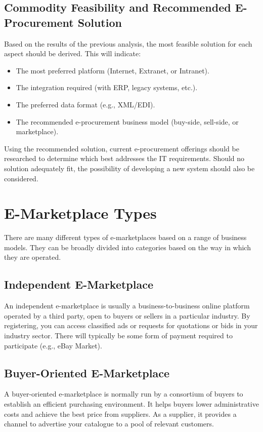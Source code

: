 \documentclass[12pt,a4paper]{article}
\begin{document}
\subsection{Commodity Feasibility and Recommended E-Procurement Solution}

Based on the results of the previous analysis, the most feasible solution for each aspect should be derived. This will indicate:
\begin{itemize}
    \item The most preferred platform (Internet, Extranet, or Intranet).
    \item The integration required (with ERP, legacy systems, etc.).
    \item The preferred data format (e.g., XML/EDI).
    \item The recommended e-procurement business model (buy-side, sell-side, or marketplace).
\end{itemize}

Using the recommended solution, current e-procurement offerings should be researched to determine which best addresses the IT requirements. Should no solution adequately fit, the possibility of developing a new system should also be considered.

\section{E-Marketplace Types}

There are many different types of e-marketplaces based on a range of business models. They can be broadly divided into categories based on the way in which they are operated.

\subsection{Independent E-Marketplace}
An independent e-marketplace is usually a business-to-business online platform operated by a third party, open to buyers or sellers in a particular industry. By registering, you can access classified ads or requests for quotations or bids in your industry sector. There will typically be some form of payment required to participate (e.g., eBay Market).

\subsection{Buyer-Oriented E-Marketplace}
A buyer-oriented e-marketplace is normally run by a consortium of buyers to establish an efficient purchasing environment. It helps buyers lower administrative costs and achieve the best price from suppliers. As a supplier, it provides a channel to advertise your catalogue to a pool of relevant customers.
\end{document}
